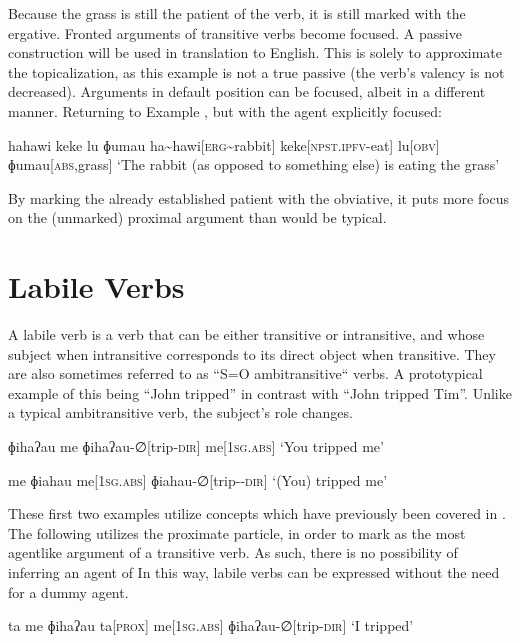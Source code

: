 Because the grass is still the patient of the verb, it is still marked with the ergative. Fronted arguments of transitive verbs become focused. A passive construction will be used in translation to English. This is solely to approximate the topicalization, as this example is not a true passive (the verb's valency is not decreased). Arguments in default position can be focused, albeit in a different manner. Returning to Example , but with the agent explicitly focused:

\ex
\begingl
\glpreamble hahawi keke lu ɸumau
\endpreamble
ha\textasciitilde hawi[\textsc{erg\textasciitilde}rabbit]
keke[\textsc{npst.ipfv-}eat]
lu[\textsc{obv}]
ɸumau[\textsc{abs,}grass]
\glft `The rabbit (as opposed to something else) is eating the grass'
\endgl
\xe

By marking the already established patient with the obviative\footnotemark, it puts more focus on the (unmarked) proximal argument than would be typical.


\section{Labile Verbs}\label{sec:labile_verbs}

A labile verb is a verb that can be either transitive or intransitive, and whose subject when intransitive corresponds to its direct object when transitive. They are also sometimes referred to as ``S=O ambitransitive`` verbs. A prototypical example of this being ``John tripped'' in contrast with ``John tripped Tim''. Unlike a typical ambitransitive verb, the subject's role changes.

\ex
\begingl
\glpreamble ɸihaʔau me
\endpreamble
ɸihaʔau-∅[trip\textsc{-dir}]
me[\textsc{1sg.abs}]
\glft `You tripped me'
\endgl
\xe

\ex
\begingl
\glpreamble me ɸiahau
\endpreamble
me[\textsc{1sg.abs}]
ɸiahau-∅[trip-\textsc{-dir}]
\glft `(You) tripped me'
\endgl
\xe

These first two examples utilize concepts which have previously been covered in . The following utilizes the proximate particle,  in order to mark  as the most agentlike argument of a transitive verb. As such, there is no possibility of inferring an agent of  In this way, labile verbs can be expressed without the need for a dummy agent.

\ex
\begingl
\glpreamble ta me ɸihaʔau
\endpreamble
ta[\textsc{prox}]
me[\textsc{1sg.abs}]
ɸihaʔau-∅[trip\textsc{-dir}]
\glft `I tripped'
\endgl
\xe

